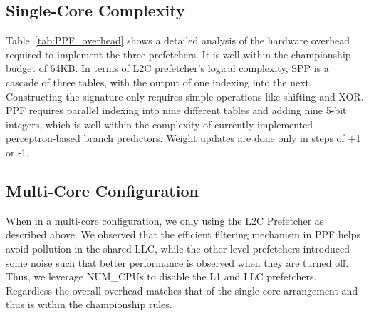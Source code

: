 \subsection{Single-Core Complexity}
\label{Config-Complex}

Table~\ref{tab:PPF_overhead}
shows a detailed analysis of the hardware overhead required to
implement the three prefetchers. It is well within the championship
budget of 64KB. In terms of L2C prefetcher's logical complexity, SPP
is a cascade of three tables, with the output of one indexing into the
next. Constructing the signature only requires simple operations like
shifting and XOR. PPF requires parallel indexing into nine different
tables and adding nine 5-bit integers, which is well within the
complexity of currently implemented perceptron-based branch
predictors.  Weight updates are done only in steps of +1 or -1.

\subsection{Multi-Core Configuration}
\label{Config-Multi}

When in a multi-core configuration, we only using the L2C Prefetcher
as described above. We observed that the efficient filtering mechanism
in PPF helps avoid pollution in the shared LLC, while the other level
prefetchers introduced some noise such that better performance is
observed when they are turned off.  Thus, we leverage NUM\_CPUs to
disable the L1 and LLC prefetchers.  Regardless the overall overhead
matches that of the single core arrangement and thus is within the
championship rules.
